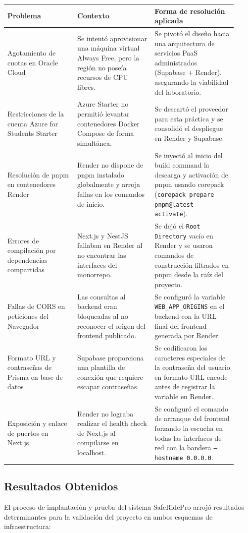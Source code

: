 \documentclass{article}
\begin{document}
\begin{longtable}{p{0.28\linewidth} p{0.31\linewidth} p{0.33\linewidth}}
\toprule
\textbf{Problema} & \textbf{Contexto} & \textbf{Forma de resolución aplicada} \\
\midrule
Agotamiento de cuotas en Oracle Cloud & Se intentó aprovisionar una máquina virtual Always Free, pero la región no poseía recursos de CPU libres. & Se pivotó el diseño hacia una arquitectura de servicios PaaS administrados (Supabase + Render), asegurando la viabilidad del laboratorio. \\
\midrule
Restricciones de la cuenta Azure for Students Starter & Azure Starter no permitió levantar contenedores Docker Compose de forma simultánea. & Se descartó el proveedor para esta práctica y se consolidó el despliegue en Render y Supabase. \\
\midrule
Resolución de pnpm en contenedores Render & Render no dispone de pnpm instalado globalmente y arroja fallas en los comandos de inicio. & Se inyectó al inicio del build command la descarga y activación de pnpm usando corepack (\texttt{corepack prepare pnpm@latest --activate}). \\
\midrule
Errores de compilación por dependencias compartidas & Next.js y NestJS fallaban en Render al no encontrar las interfaces del monorrepo. & Se dejó el \texttt{Root Directory} vacío en Render y se usaron comandos de construcción filtrados en pnpm desde la raíz del proyecto. \\
\midrule
Fallas de CORS en peticiones del Navegador & Las consultas al backend eran bloqueadas al no reconocer el origen del frontend publicado. & Se configuró la variable \texttt{WEB\_APP\_ORIGINS} en el backend con la URL final del frontend generada por Render. \\
\midrule
Formato URL y contraseñas de Prisma en base de datos & Supabase proporciona una plantilla de conexión que requiere escapar contraseñas. & Se codificaron los caracteres especiales de la contraseña del usuario en formato URL encode antes de registrar la variable en Render. \\
\midrule
Exposición y enlace de puertos en Next.js & Render no lograba realizar el health check de Next.js al compilarse en localhost. & Se configuró el comando de arranque del frontend forzando la escucha en todas las interfaces de red con la bandera \texttt{--hostname 0.0.0.0}. \\
\bottomrule
\end{longtable}

\subsection{Resultados Obtenidos}
El proceso de implantación y prueba del sistema SafeRidePro arrojó resultados determinantes para la validación del proyecto en ambos esquemas de infraestructura:
\end{document}
